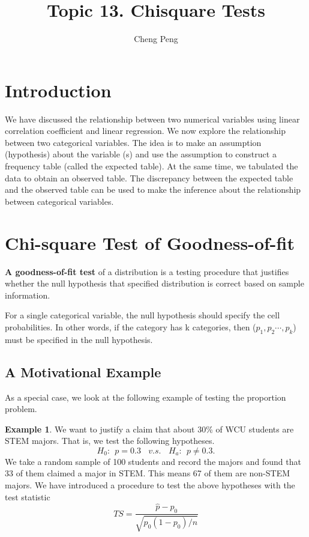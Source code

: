 \documentclass[
]{article}
\title{Topic 13. Chisquare Tests}
\author{Cheng Peng}
\date{}
\begin{document}
\maketitle

{
\setcounter{tocdepth}{4}
\tableofcontents
}
\hfill\break

\hfill\break

\hypertarget{introduction}{%
\section{Introduction}\label{introduction}}

We have discussed the relationship between two numerical variables using
linear correlation coefficient and linear regression. We now explore the
relationship between two categorical variables. The idea is to make an
assumption (hypothesis) about the variable (s) and use the assumption to
construct a frequency table (called the expected table). At the same
time, we tabulated the data to obtain an observed table. The discrepancy
between the expected table and the observed table can be used to make
the inference about the relationship between categorical variables.

\hypertarget{chi-square-test-of-goodness-of-fit}{%
\section{Chi-square Test of
Goodness-of-fit}\label{chi-square-test-of-goodness-of-fit}}

\textbf{A goodness-of-fit test} of a distribution is a testing procedure
that justifies whether the null hypothesis that specified distribution
is correct based on sample information.

For a single categorical variable, the null hypothesis should specify
the cell probabilities. In other words, if the category has k
categories, then (\(p_1, p_2 \cdots, p_k\)) must be specified in the
null hypothesis.

\hypertarget{a-motivational-example}{%
\subsection{A Motivational Example}\label{a-motivational-example}}

As a special case, we look at the following example of testing the
proportion problem.

\textbf{Example 1}. We want to justify a claim that about 30\% of WCU
students are STEM majors. That is, we test the following hypotheses. \[
H_0: \  \ p = 0.3 \ \ \ \ v.s. \ \ \ \ H_a: \ \ p \ne 0.3.
\] We take a random sample of 100 students and record the majors and
found that 33 of them claimed a major in STEM. This means 67 of them are
non-STEM majors. We have introduced a procedure to test the above
hypotheses with the test statistic \[
TS = \frac{\hat{p}-p_0}{\sqrt{p_0(1-p_0)/n}}
\]
\end{document}
